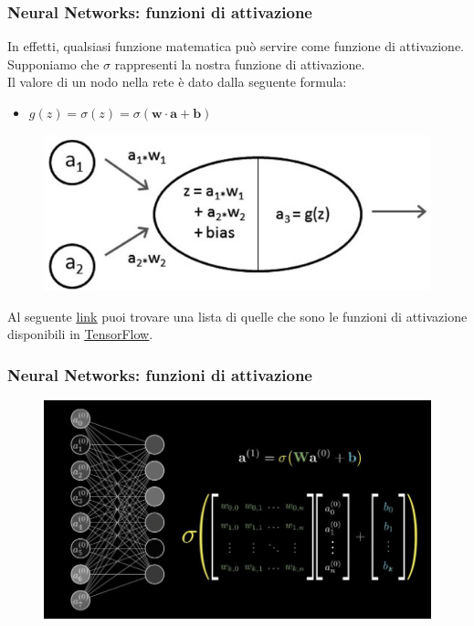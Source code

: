 \begin{frame}

	\frametitle{Neural Networks: funzioni di attivazione}

	In effetti, qualsiasi funzione matematica può servire come funzione di attivazione.
	\newlinedouble
	Supponiamo che $\sigma$ rappresenti la nostra funzione di attivazione.\\
	Il valore di un nodo nella rete è dato dalla seguente formula:

	\begin{itemize}
		\item $g(z) = \sigma(z) = \sigma(\pmb{w} \cdot \pmb{a}+\pmb{b})$
	\end{itemize}
	
	\begin{figure}[!htbp]
		\centering
		\includegraphics[width=0.5\linewidth]{images/supervised/z_algorithms_neural_networks/neuron.jpg}
	\end{figure}
	Al seguente \underline{\href{https://www.tensorflow.org/api_docs/python/tf/nn}{link}} puoi trovare una lista di quelle che sono le funzioni di attivazione disponibili in \underline{\href{https://www.tensorflow.org/}{TensorFlow}}.

	
\end{frame}


\begin{frame}

	\frametitle{Neural Networks: funzioni di attivazione}

	\begin{figure}[!htbp]
		\centering
		\includegraphics[width=1.0\linewidth]{images/supervised/z_algorithms_neural_networks/nn_sigma_formula.png}
	\end{figure}

\end{frame}



